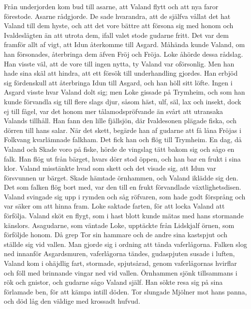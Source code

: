 Från underjorden kom bud till asarne, att Valand flytt och att nya faror
förestode. Asarne rådgjorde. De sade hvarandra, att de själfva vållat
det hat Valand till dem hyste,
\protect\hypertarget{lb1625905.xhtmlux5cux23start103}{}{}\protect\hypertarget{lb1625905.xhtmlux5cux23start103-a}{}{}\protect\hypertarget{lb1625905.xhtmlux5cux23start103-b}{}{}\protect\hypertarget{lb1625905.xhtmlux5cux23start103-c}{}{}\protect\hypertarget{lb1625905.xhtmlux5cux23start103-d}{}{}
och att det vore bättre att försona sig med honom och Ivaldeslägten än
att utrota dem, ifall valet stode gudarne fritt. Det var dem framför
allt af vigt, att Idun återkomme till Asgard. Måhända kunde Valand, om
han försonades, återbringa dem äfven Fröj och Fröja. Loke åhörde dessa
rådslag. Han visste väl, att de vore till ingen nytta, ty Valand var
oförsonlig. Men han hade sina skäl att hindra, att ett försök till
underhandling gjordes. Han erbjöd sig fördenskull att återbringa Idun
till Asgard, och han höll sitt löfte. Ingen i Asgard visste hvar Valand
dolt sig; men Loke gissade på Trymheim, och som han kunde förvandla sig
till flere slags djur, såsom häst, ulf, säl, lax och insekt, dock ej
till fågel, var det honom mer tålamodspröfvande än svårt att utransaka
Valands tillhåll. Han fann den lille fjällsjön, där Ivaldesonen plägade
fiska, och dörren till hans salar. När det skett, begärde han af gudarne
att få låna Fröjas i Folkvang kvarlämnade falkham. Det fick han och flög
till Trymheim. En dag, då Valand och Skade voro på fiske, hörde de
vingslag tätt bakom sig och sågo en falk. Han flög ut från bärget, hvars
dörr stod öppen, och han bar en frukt i sina klor. Valand misstänkte
hvad som skett och det visade sig, att Idun var försvunnen ur bärget.
Skade hämtade örnhammen, och Valand iklädde sig den. Det som falken flög
bort med, var den till en frukt förvandlade växtlighetsdisen. Valand
svingade sig upp i rymden och såg röfvaren, som hade godt försprång och
var säker om att hinna fram. Loke saktade farten, för att locka Valand
att förfölja. Valand sköt en flygt, som i hast blott kunde mätas med
hans stormande känslors. Asagudarne, som väntade Loke, upptäckte från
Lidskjalf örnen, som förföljde honom. Då grep Tor sin hammare och de
andre sina kastspjut och ställde sig vid vallen. Man gjorde sig i
ordning att tända vaferlågorna. Falken slog ned innanför Asgardsmuren,
vaferlågorna tändes, gudaspjuten susade i luften, Valand kom i ohäjdlig
fart, stormade, spjutsårad, genom vaferlågornas hvirflar och föll med
brinnande vingar ned vid vallen. Örnhammen sjönk tillsammans i rök och
gnistor, och
\protect\hypertarget{lb1625905.xhtmlux5cux23start104}{}{}\protect\hypertarget{lb1625905.xhtmlux5cux23start104-a}{}{}\protect\hypertarget{lb1625905.xhtmlux5cux23start104-b}{}{}\protect\hypertarget{lb1625905.xhtmlux5cux23start104-c}{}{}\protect\hypertarget{lb1625905.xhtmlux5cux23start104-d}{}{}
gudarne sågo Valand själf. Han sökte resa sig på sina förlamade ben, för
att kämpa intill döden. Tor slungade Mjölner mot hans panna, och död låg
den väldige med krossadt hufvud.

